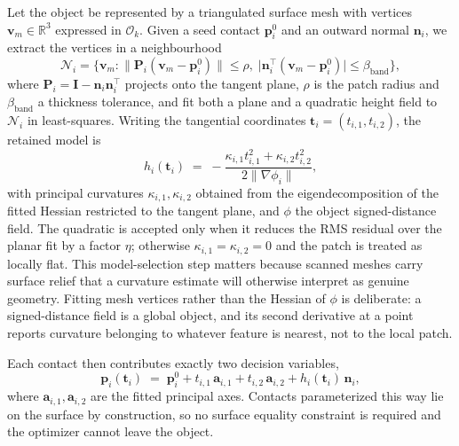 Let the object be represented by a triangulated surface mesh with vertices
$\bm{v}_m \in \mathbb{R}^3$ expressed in $\mathcal{O}_k$. Given a seed contact
$\bm{p}_i^0$ and an outward normal $\bm{n}_i$, we extract the vertices in a
neighbourhood
%
\begin{equation}
  \mathcal{N}_i = \bigl\{ \bm{v}_m : \lVert \bm{P}_i (\bm{v}_m - \bm{p}_i^0) \rVert \le \rho,\;
                   \lvert \bm{n}_i^{\top}(\bm{v}_m - \bm{p}_i^0) \rvert \le \beta_{\mathrm{band}} \bigr\},
\end{equation}
%
where $\bm{P}_i = \bm{I} - \bm{n}_i \bm{n}_i^{\top}$ projects onto the tangent
plane, $\rho$ is the patch radius and $\beta_{\mathrm{band}}$ a thickness
tolerance, and fit both a plane and a quadratic height field to
$\mathcal{N}_i$ in least-squares. Writing the tangential coordinates
$\bm{t}_i = (t_{i,1}, t_{i,2})$, the retained model is
%
\begin{equation}
  h_i(\bm{t}_i) \;=\; -\frac{\kappa_{i,1} t_{i,1}^2 + \kappa_{i,2} t_{i,2}^2}{2 \lVert \nabla \phi_i \rVert},
  \label{eq:patch-height}
\end{equation}
%
with principal curvatures $\kappa_{i,1}, \kappa_{i,2}$ obtained from the
eigendecomposition of the fitted Hessian restricted to the tangent plane, and
$\phi$ the object signed-distance field. The quadratic is accepted only when it
reduces the RMS residual over the planar fit by a factor $\eta$; otherwise
$\kappa_{i,1} = \kappa_{i,2} = 0$ and the patch is treated as locally flat. This
model-selection step matters because scanned meshes carry surface relief that a
curvature estimate will otherwise interpret as genuine geometry. Fitting mesh
vertices rather than the Hessian of $\phi$ is deliberate: a signed-distance field is a
global object, and its second derivative at a point reports curvature belonging to
whatever feature is nearest, not to the local patch.

Each contact then contributes exactly two decision variables,
%
\begin{equation}
  \bm{p}_i(\bm{t}_i) \;=\; \bm{p}_i^0 + t_{i,1}\, \bm{a}_{i,1} + t_{i,2}\, \bm{a}_{i,2} + h_i(\bm{t}_i)\, \bm{n}_i ,
  \label{eq:patch}
\end{equation}
%
where $\bm{a}_{i,1}, \bm{a}_{i,2}$ are the fitted principal axes. Contacts
parameterized this way lie on the surface by construction, so no surface
equality constraint is required and the optimizer cannot leave the object.

